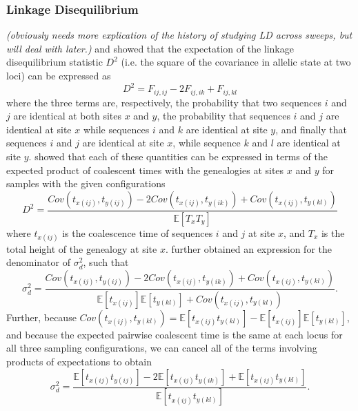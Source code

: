 \documentclass[a4paper,10pt]{article}
\newcommand{\jb}[1]{{\it\color{blue} (#1)} }
\begin{document}
\subsubsection{Linkage Disequilibrium}
\jb{obviously needs more explication of the history of studying LD across sweeps, but will deal with later.}
\cite{StrobeckMorgan78} and \cite{Hudson85} showed that the expectation of the linkage disequilibrium statistic $D^2$ (i.e. the square of the covariance in allelic state at two loci) can be expressed as
\begin{equation}
	D^2 = F_{ij,ij} - 2F_{ij,ik} + F_{ij,kl}
\end{equation}
where the three terms are, respectively, the probability that two sequences $i$ and $j$ are identical at both sites $x$ and $y$, the probability that sequences $i$ and $j$ are identical at site $x$ while sequences $i$ and $k$ are identical at site $y$, and finally that sequences $i$ and $j$ are identical at site $x$, while sequence $k$ and $l$ are identical at site $y$. \cite{McVean2002} showed that each of these quantities can be expressed in terms of the expected product of coalescent times with the genealogies at sites $x$ and $y$ for samples with the given configurations
\begin{equation}
	D^2 = \frac{Cov\left(t_{x\left(ij\right)},t_{y\left(ij\right)}\right) - 2Cov\left(t_{x\left(ij\right)},t_{y\left(ik\right)}\right) + Cov\left(t_{x\left(ij\right)},t_{y\left(kl\right)}\right)}{\mathbb{E}\left[T_x T_y\right]}
\end{equation}
where $t_{x\left(ij\right)}$ is the coalescence time of sequences $i$ and $j$ at site $x$, and $T_x$ is the total height of the genealogy at site $x$. \cite{McVean2002} further obtained an expression for the denominator of $\sigma_d^2$, such that
\begin{equation}
	\sigma_d^2 = \frac{Cov\left(t_{x\left(ij\right)},t_{y\left(ij\right)}\right) - 2Cov\left(t_{x\left(ij\right)},t_{y\left(ik\right)}\right) + Cov\left(t_{x\left(ij\right)},t_{y\left(kl\right)}\right)}{\mathbb{E}\left[t_{x\left(ij\right)}\right]\mathbb{E}\left[t_{y\left(kl\right)}\right] + Cov\left(t_{x\left(ij\right)},t_{y\left(kl\right)}\right)}.
\end{equation}
Further, because $Cov\left(t_{x\left(ij\right)},t_{y\left(kl\right)}\right) = \mathbb{E}\left[t_{x\left(ij\right)}t_{y\left(kl\right)}\right] - \mathbb{E}\left[t_{x\left(ij\right)}\right]\mathbb{E}\left[t_{y\left(kl\right)}\right]$, and because the expected pairwise coalescent time is the same at each locus for all three sampling configurations, we can cancel all of the terms involving products of expectations to obtain
\begin{equation}
	\sigma_d^2 = \frac{\mathbb{E}\left[t_{x\left(ij\right)}t_{y\left(ij\right)}\right] - 2\mathbb{E}\left[t_{x\left(ij\right)}t_{y\left(ik\right)}\right] + \mathbb{E}\left[t_{x\left(ij\right)}t_{y\left(kl\right)}\right]}{\mathbb{E}\left[t_{x\left(ij\right)}t_{y\left(kl\right)}\right]}.
\end{equation}
\end{document}
